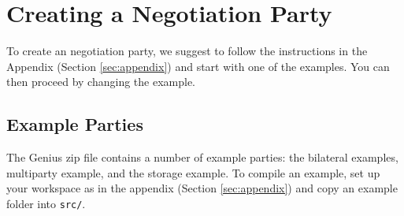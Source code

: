 \documentclass[]{article}
\newcommand\Genius{{\sc Genius}}
\begin{document}
%
%
%
%



\section{Creating a Negotiation Party}\label{sec:createagent}
To create an negotiation party, we suggest to follow the instructions in the Appendix (Section \ref{sec:appendix}) and start with one of the examples.
You can then proceed by changing the example.


\subsection{Example Parties}
The {\Genius} zip file contains a number of example parties: the bilateral examples, multiparty example, and the storage example. To compile an example, set up your workspace as in the appendix (Section \ref{sec:appendix}) and copy an example folder into  \verb|src/|.
\end{document}
